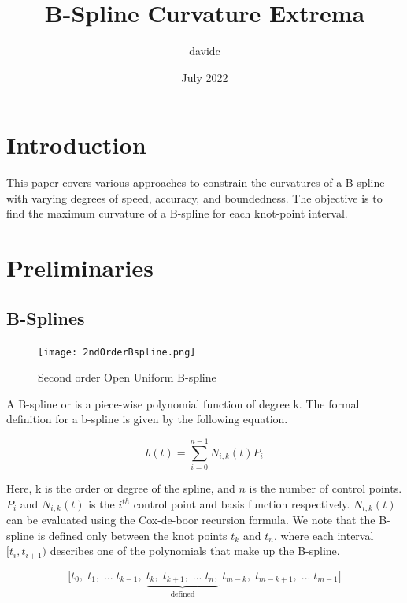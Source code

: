 \documentclass{article}
\title{B-Spline Curvature Extrema}
\author{davidc}
\date{July 2022}
\begin{document}
\maketitle

\section{Introduction}

This paper covers various approaches to constrain the curvatures of a B-spline with varying degrees of speed, accuracy, and boundedness. The objective is to find the maximum curvature of a B-spline for each knot-point interval.

\section{Preliminaries}

\subsection{B-Splines}

\begin{figure}[H]
\begin{center}
\texttt{[image: 2ndOrderBspline.png]}
\end{center}
\caption{Second order Open Uniform B-spline}
\label{Fig:2ndOrderBspline}
\end{figure}

 A B-spline or  is a piece-wise polynomial function of degree k. The formal definition for a b-spline is given by the following equation.
 
   \begin{equation} \label{eq:B-Spline equation}
      b(t) = \sum^{n-1}_{i=0} N_{i,k}(t) P_i
  \end{equation}
  
  Here, k is the order or degree of the spline, and \(n\) is the number of control points. \(P_i\) and \(N_{i,k}(t)\) is the \(i^{th}\) control point and basis function respectively. \(N_{i,k}(t)\) can be evaluated using the Cox-de-boor recursion formula. We note that the B-spline is defined only between the knot points \(t_k\) and \(t_n\), where each interval \([t_i , t_{i+1})\) describes one of the polynomials that make up the B-spline.

\begin{equation}
    \Big[ t_0, \; t_1,  \; ... \; t_{k-1} , \; \underbrace{t_k, \; t_{k+1}, \; ... \; t_n,}_{\text{defined}} \; t_{m-k}, \; t_{m-k+1}, \; ... \; t_{m-1} \Big]
\end{equation}
  
\end{document}
